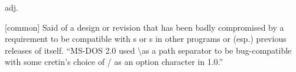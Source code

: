  adj.

[common] Said of a design or revision that has been badly compromised by a
requirement to be compatible with s or s
in other programs or (esp.) previous releases of itself. ``MS-DOS 2.0 used
\textbackslash as a path separator to be bug-compatible with some cretin's
choice of / as an option character in 1.0.''

